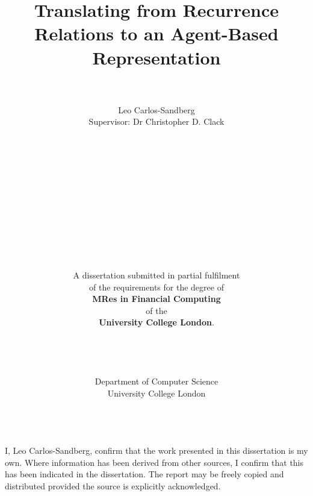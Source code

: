\documentclass{article}
\begin{document}
 
\title{Translating from Recurrence Relations to an Agent-Based Representation} 
\author{
\\
\\
Leo Carlos-Sandberg\\
Supervisor: Dr Christopher D. Clack\\
\\
\\
\\
\\
\\
\\
\\
\\
\\
\\
\\
\\
A dissertation submitted in partial fulfilment\\
 of the requirements for the degree of\\
 \textbf{MRes in Financial Computing}\\
 of the \\
 \textbf{University College London}.
 \\
 \\
 \\
 \\
 \\
 Department of Computer Science\\
 University College London
 \\
 \\} 
\maketitle 

\newpage
I, Leo Carlos-Sandberg, confirm that the work presented in this dissertation is my own. Where information has been derived from other sources, I confirm that this has been indicated in the dissertation. The report may be freely copied and distributed provided the source is explicitly acknowledged.
\end{document}
